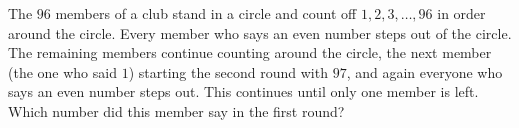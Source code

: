 The $96$ members of a club stand in a circle and count off $1,2,3,\dots,96$ in order around the circle. Every member who says an even number steps out of the circle. The remaining members continue counting around the circle, the next member (the one who said $1$) starting the second round with $97$, and again everyone who says an even number steps out. This continues until only one member is left. Which number did this member say in the first round?
